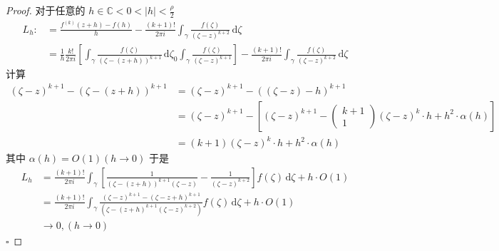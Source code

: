 \documentclass[../../复变函数.tex]{subfiles}
\begin{document}
\begin{proof}
    对于任意的 \(  h \in \mathbb{C} <0< \left| h \right|< \frac{\rho  }{2 }    \) \[
    \begin{aligned}
  L_{h}: &=    \frac{f^{\left( k \right)  }\left( z+ h \right)-f\left( h \right)  }{h } -  \frac{\left( k+ 1 \right)!  }{2\pi i }\int_{ \gamma }\frac{f\left( \zeta  \right)  }{\left( \zeta -z \right)^{k+ 2}  }\,\mathrm{d} \zeta   \\ 
   & = \frac{1 }{h }\frac{k! }{2\pi i }\left[ \int_{ \gamma }\frac{f\left( \zeta  \right)  }{\left( \zeta -\left( z+ h \right)  \right)^{k+ 1}  }\,\mathrm{d} \zeta _0 \int_{ \gamma }\frac{f\left( \zeta  \right)  }{\left( \zeta -z \right)^{k+ 1}  }   \right]-\frac{\left( k+ 1 \right)!  }{2\pi i } \int_{ \gamma }\frac{f\left( \zeta  \right)  }{\left( \zeta -z \right)^{k+ 2}  }\,\mathrm{d} \zeta      
    \end{aligned}
    \]  计算\[
    \begin{aligned}
    \left( \zeta -z \right)^{k+ 1}  -\left( \zeta -\left( z+ h \right)  \right)^{k+ 1}&= \left( \zeta -z \right)^{k+ 1}- \left( \left( \zeta -z \right)-h  \right)^{k+ 1}   \\ 
     & = \left( \zeta -z \right)^{k+ 1}-\left[ \left( \zeta -z \right)^{k+ 1}-\begin{pmatrix} 
         k+ 1 \\ 
          1
     \end{pmatrix} \left( \zeta -z \right)^{k}\cdot h+ h^{2}\cdot  \alpha \left( h \right)     \right]  \\ 
      &= \left( k+ 1 \right)\left( \zeta -z \right)^{k}\cdot h+ h^{2}\cdot  \alpha \left( h \right)   
    \end{aligned}
    \]其中 \(  \alpha \left( h \right)= O\left( 1 \right)\left( h\to 0 \right)     \) 于是 \[
   \begin{aligned}
    L_{h}&= \frac{\left( k+ 1 \right)!  }{2\pi i }\int_{ \gamma }\left[ \frac{1 }{\left( \zeta -\left( z+ h \right)  \right)^{k+ 1}\left( \zeta -z \right)   }  -\frac{1 }{\left( \zeta -z \right)^{k+ 2}  }  \right]f\left( \zeta  \right)\,\mathrm{d} \zeta  + h\cdot O\left( 1 \right)  \\ 
     & = \frac{\left( k+ 1 \right)!  }{2\pi i }\int_{ \gamma }\frac{\left( \zeta -z \right)^{k+ 1}-\left( \zeta -z+ h \right)^{k+ 1}   }{ \left( \zeta -\left( z+ h \right)^{k+ 1}\left( \zeta -z \right)^{k+ 2}   \right) }f\left( \zeta  \right)\,\mathrm{d} \zeta     + h\cdot O\left( 1 \right) \\ 
      &\to 0,\left( h\to 0 \right) 
   \end{aligned} 
    \]
    \hfill $\square$
\end{proof}
\end{document}
